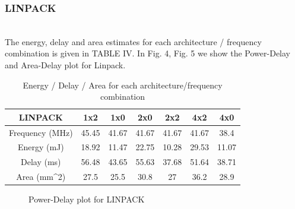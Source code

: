 \subsubsection{LINPACK}
\\
The energy, delay and area estimates for each architecture / frequency combination is given in TABLE IV.
In Fig. 4, Fig. 5 we show the Power-Delay and Area-Delay plot for Linpack.

\begin{table}[h!]
\caption{Energy / Delay / Area for each architecture/frequency combination}
\begin{center}
{\begin{tabular}{c | c   c   c   c    c   c}
\hline
LINPACK &1x2 &1x0 &2x0 &2x2 &4x2 &4x0 \\ [1ex]
\hline
Frequency (MHz) & 45.45& 41.67& 41.67& 41.67&41.67 & 38.4\\[1ex]
Energy (mJ) &18.92 &11.47 &22.75 &10.28 &29.53 &11.07 \\ [1ex]

Delay (ms)& 56.48& 43.65& 55.63& 37.68& 51.64& 38.71\\[1ex] 
Area (mm^2)& 27.5& 25.5& 30.8& 27& 36.2& 28.9\\[1ex]
\hline

\end{tabular}}
\label{diffstruc}
\end{center}
\end{table}


\begin{figure}[h!]
{\centering {} \par}
\caption{Power-Delay plot for LINPACK}
\end{figure}

